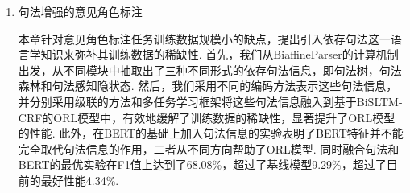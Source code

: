 \begin{enumerate}


      \item 句法增强的意见角色标注

            本章针对意见角色标注任务训练数据规模小的缺点，提出引入依存句法这一语言学知识来弥补其训练数据的稀缺性.
            首先，我们从BiaffineParser的计算机制出发，从不同模块中抽取出了三种不同形式的依存句法信息，即句法树，句法森林和句法感知隐状态. 然后，我们采用不同的编码方法表示这些句法信息，并分别采用级联的方法和多任务学习框架将这些句法信息融入到基于BiSLTM-CRF的ORL模型中，有效地缓解了训练数据的稀缺性，显著提升了ORL模型的性能. 此外，在BERT的基础上加入句法信息的实验表明了BERT特征并不能完全取代句法信息的作用，二者从不同方向帮助了ORL模型. 同时融合句法和BERT的最优实验在F1值上达到了68.08\%，超过了基线模型9.29\%，超过了目前的最好性能4.34\%.
\end{enumerate}


